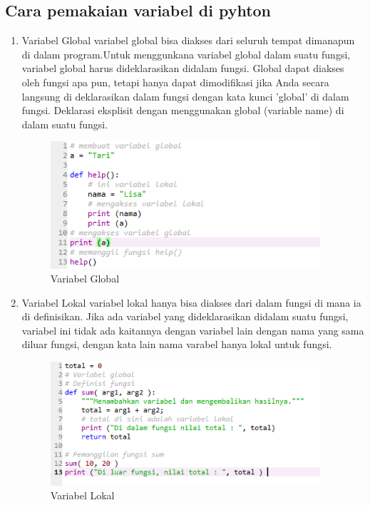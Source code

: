\subsection{Cara pemakaian variabel di pyhton}
\begin{enumerate}
    \item Variabel Global
    variabel global bisa diakses dari seluruh tempat dimanapun di dalam program.Untuk menggunkana variabel global dalam suatu fungsi, variabel global harus dideklarasikan didalam fungsi. Global dapat diakses oleh fungsi apa pun, tetapi hanya dapat dimodifikasi jika Anda secara langsung di deklarasikan dalam fungsi dengan kata kunci 'global' di dalam fungsi. Deklarasi eksplisit dengan menggunakan global (variable name) di dalam suatu fungsi. 
    \newpage
    \begin{figure}[!htbp]
        \centering
        \includegraphics[width=10cm]{figures/variabel_global.PNG}
        \caption{Variabel Global}
    \end{figure}
    \item Variabel Lokal
    variabel lokal hanya bisa diakses dari dalam fungsi di mana ia di definisikan. Jika ada variabel yang dideklarasikan didalam suatu fungsi, variabel ini tidak ada kaitannya dengan variabel lain dengan nama yang sama diluar fungsi, dengan kata lain nama varabel hanya lokal untuk fungsi. 
    \begin{figure}[!htbp]
        \centering
        \includegraphics[width=10cm]{figures/variabel.PNG}
        \caption{Variabel Lokal}
        \label{}
    \end{figure}
\end{enumerate}
\newpage

